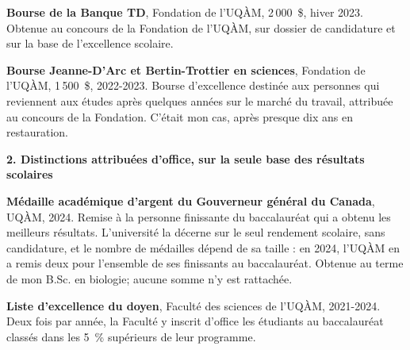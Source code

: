 \documentclass[12pt,letterpaper]{article}
\newcommand{\groupe}[1]{\par\vspace{3pt}\textbf{#1}\par\vspace{-0.5pt}}
\begin{document}
\textbf{Bourse de la Banque TD}, Fondation de l'UQÀM, 2\,000~\$, hiver 2023. Obtenue au concours de la Fondation de l'UQÀM, sur dossier de candidature et sur la base de l'excellence scolaire.

\textbf{Bourse Jeanne-D'Arc et Bertin-Trottier en sciences}, Fondation de l'UQÀM, 1\,500~\$, 2022-2023. Bourse d'excellence destinée aux personnes qui reviennent aux études après quelques années sur le marché du travail, attribuée au concours de la Fondation. C'était mon cas, après presque dix ans en restauration.

\groupe{2. Distinctions attribuées d'office, sur la seule base des résultats scolaires}

\textbf{Médaille académique d'argent du Gouverneur général du Canada}, UQÀM, 2024. Remise à la personne finissante du baccalauréat qui a obtenu les meilleurs résultats. L'université la décerne sur le seul rendement scolaire, sans candidature, et le nombre de médailles dépend de sa taille : en 2024, l'UQÀM en a remis deux pour l'ensemble de ses finissants au baccalauréat. Obtenue au terme de mon B.Sc. en biologie; aucune somme n'y est rattachée.

\textbf{Liste d'excellence du doyen}, Faculté des sciences de l'UQÀM, 2021-2024. Deux fois par année, la Faculté y inscrit d'office les étudiants au baccalauréat classés dans les 5~\% supérieurs de leur programme.
\end{document}

